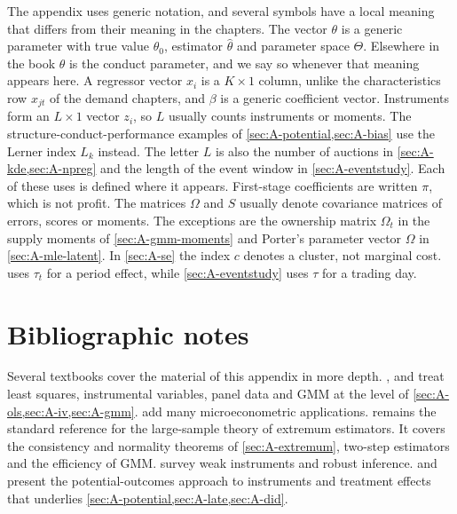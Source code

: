 The appendix uses generic notation, and several symbols have a local meaning that differs from their meaning in the
chapters. The vector $\theta$ is a generic parameter with true value $\theta_0$, estimator $\hat\theta$ and parameter
space $\Theta$. Elsewhere in the book $\theta$ is the conduct parameter, and we say so whenever that meaning appears
here. A regressor vector $x_i$ is a $K \times 1$ column, unlike the characteristics row $x_{jt}$ of the demand
chapters, and $\beta$ is a generic coefficient vector. Instruments form an $L \times 1$ vector $z_i$, so $L$ usually
counts instruments or moments. The structure-conduct-performance examples of \cref{sec:A-potential,sec:A-bias} use the
Lerner index $L_k$ instead. The letter $L$ is also the number of auctions in \cref{sec:A-kde,sec:A-npreg} and the
length of the event window in \cref{sec:A-eventstudy}. Each of these uses is defined where it appears. First-stage coefficients
are written $\pi$, which is not profit. The matrices $\Omega$ and $S$ usually denote covariance matrices of errors,
scores or moments. The exceptions are the ownership matrix $\Omega_t$ in the supply moments of
\cref{sec:A-gmm-moments} and Porter's parameter vector $\Omega$ in \cref{sec:A-mle-latent}. In \cref{sec:A-se} the index $c$ denotes a
cluster, not marginal cost.  uses $\tau_t$ for a period effect, while \cref{sec:A-eventstudy} uses
$\tau$ for a trading day.







\section{Bibliographic notes}\label{sec:A-notes}

Several textbooks cover the material of this appendix in more depth. \citet{Hayashi2000}, \citet{Wooldridge2010} and
\citet{Hansen2022} treat least squares, instrumental variables, panel data and GMM at the level of
\cref{sec:A-ols,sec:A-iv,sec:A-gmm}. \citet{CameronTrivedi2005} add many microeconometric applications.
\citet{NeweyMcFadden1994} remains the standard reference for the large-sample theory of extremum estimators. It covers
the consistency and normality theorems of \cref{sec:A-extremum}, two-step estimators and the efficiency of GMM.
\citet{AndrewsStockSun2019} survey weak instruments and robust inference. \citet{AngristPischke2009} and
\citet{ImbensRubin2015} present the potential-outcomes approach to instruments and treatment effects that underlies
\cref{sec:A-potential,sec:A-late,sec:A-did}.

